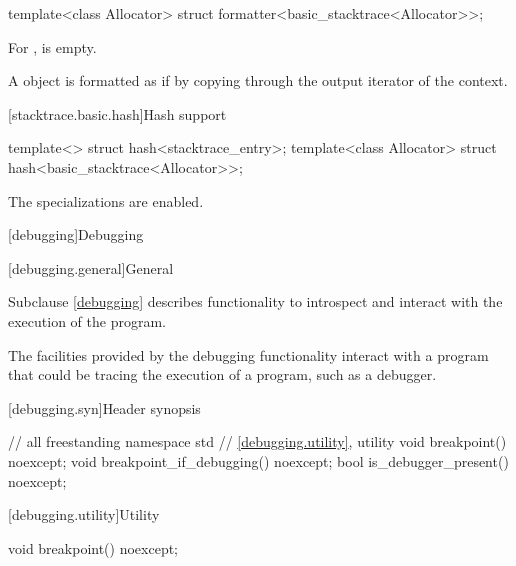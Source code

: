 \begin{itemdecl}
template<class Allocator> struct formatter<basic_stacktrace<Allocator>>;
\end{itemdecl}

\begin{itemdescr}
\pnum
For ,
 is empty.

\pnum
A  object  is formatted as if by
copying  through the output iterator of the context.
\end{itemdescr}

[stacktrace.basic.hash]{Hash support}

\begin{itemdecl}
template<> struct hash<stacktrace_entry>;
template<class Allocator> struct hash<basic_stacktrace<Allocator>>;
\end{itemdecl}

\begin{itemdescr}
\pnum
The specializations are enabled.
\end{itemdescr}

[debugging]{Debugging}

[debugging.general]{General}

\pnum
Subclause \ref{debugging} describes functionality to introspect and
interact with the execution of the program.

\begin{note}
The facilities provided by the debugging functionality interact with a program
that could be tracing the execution of a \Cpp{} program, such as a debugger.
\end{note}

[debugging.syn]{Header  synopsis}

%
\begin{codeblock}
// all freestanding
namespace std {
  // \ref{debugging.utility}, utility
  void breakpoint() noexcept;
  void breakpoint_if_debugging() noexcept;
  bool is_debugger_present() noexcept;
}
\end{codeblock}

[debugging.utility]{Utility}

%
\begin{itemdecl}
void breakpoint() noexcept;
\end{itemdecl}


